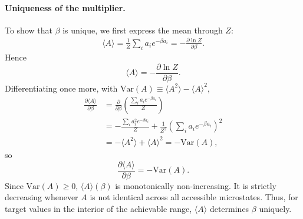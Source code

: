 \paragraph{Uniqueness of the multiplier.}
To show that $\beta$ is unique, we first express the mean through $Z$:
\begin{align*}
    \langle A\rangle = \frac{1}{Z}\sum_i a_i e^{-\beta a_i}
    = -\frac{\partial\ln Z}{\partial\beta}.
\end{align*}
Hence
\begin{equation}
    \boxed{\langle A\rangle = -\frac{\partial\ln Z}{\partial\beta}.}
\end{equation}
Differentiating once more, with $\mathrm{Var}(A)\equiv\langle A^2\rangle-\langle A\rangle^2$,
\begin{align*}
    \frac{\partial\langle A\rangle}{\partial\beta}
    &= \frac{\partial}{\partial\beta}
    \left(\frac{\sum_i a_i e^{-\beta a_i}}{Z}\right) \\
    &= -\frac{\sum_i a_i^2 e^{-\beta a_i}}{Z}
    +\frac{1}{Z^2}\left(\sum_i a_i e^{-\beta a_i}\right)^2 \\
    &= -\langle A^2\rangle+\langle A\rangle^2
    = -\mathrm{Var}(A),
\end{align*}
so
\begin{equation}
    \boxed{\frac{\partial\langle A\rangle}{\partial\beta} = -\mathrm{Var}(A).}
\end{equation}
Since $\mathrm{Var}(A)\geq0$, $\langle A\rangle(\beta)$ is monotonically
non-increasing. It is strictly decreasing whenever $A$ is not identical
across all accessible microstates. Thus, for target values in the interior
of the achievable range, $\langle A\rangle$ determines $\beta$ uniquely.

